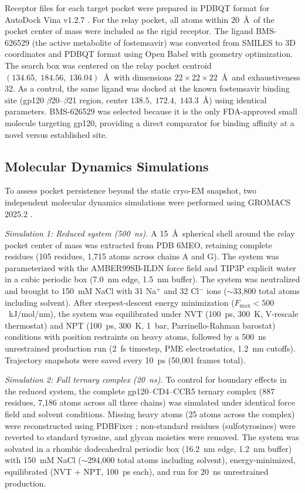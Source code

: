 \documentclass[11pt,a4paper]{article}
\begin{document}
Receptor files for each target pocket were prepared in PDBQT format for AutoDock Vina v1.2.7 \citep{Eberhardt2021,Trott2010}. For the relay pocket, all atoms within 20~\AA\ of the pocket center of mass were included as the rigid receptor. The ligand BMS-626529 (the active metabolite of fostemsavir) was converted from SMILES to 3D coordinates and PDBQT format using Open Babel \citep{OBoyle2011} with geometry optimization. The search box was centered on the relay pocket centroid $(134.65,\; 184.56,\; 136.04)$~\AA\ with dimensions $22 \times 22 \times 22$~\AA\ and exhaustiveness 32. As a control, the same ligand was docked at the known fostemsavir binding site (gp120 $\beta$20--$\beta$21 region, center $138.5,\; 172.4,\; 143.3$~\AA) using identical parameters. BMS-626529 was selected because it is the only FDA-approved small molecule targeting gp120, providing a direct comparator for binding affinity at a novel versus established site.

\subsection{Molecular Dynamics Simulations}

To assess pocket persistence beyond the static cryo-EM snapshot, two independent molecular dynamics simulations were performed using GROMACS 2025.2 \citep{Abraham2015}.

\textit{Simulation 1: Reduced system (500~ns).} A 15~\AA\ spherical shell around the relay pocket center of mass was extracted from PDB 6MEO, retaining complete residues (105 residues, 1,715 atoms across chains A and G). The system was parameterized with the AMBER99SB-ILDN force field and TIP3P explicit water in a cubic periodic box (7.0~nm edge, 1.5~nm buffer). The system was neutralized and brought to 150~mM NaCl with 31 Na$^+$ and 32 Cl$^-$ ions (${\sim}$33,800 total atoms including solvent). After steepest-descent energy minimization ($F_\mathrm{max} < 500$~kJ/mol/nm), the system was equilibrated under NVT (100~ps, 300~K, V-rescale thermostat) and NPT (100~ps, 300~K, 1~bar, Parrinello-Rahman barostat) conditions with position restraints on heavy atoms, followed by a 500~ns unrestrained production run (2~fs timestep, PME electrostatics, 1.2~nm cutoffs). Trajectory snapshots were saved every 10~ps (50,001 frames total).

\textit{Simulation 2: Full ternary complex (20~ns).} To control for boundary effects in the reduced system, the complete gp120--CD4--CCR5 ternary complex (887 residues, 7,186 atoms across all three chains) was simulated under identical force field and solvent conditions. Missing heavy atoms (25 atoms across the complex) were reconstructed using PDBFixer \citep{Eastman2017}; non-standard residues (sulfotyrosines) were reverted to standard tyrosine, and glycan moieties were removed. The system was solvated in a rhombic dodecahedral periodic box (16.2~nm edge, 1.2~nm buffer) with 150~mM NaCl (${\sim}$294,000 total atoms including solvent), energy-minimized, equilibrated (NVT + NPT, 100~ps each), and run for 20~ns unrestrained production.
\end{document}
